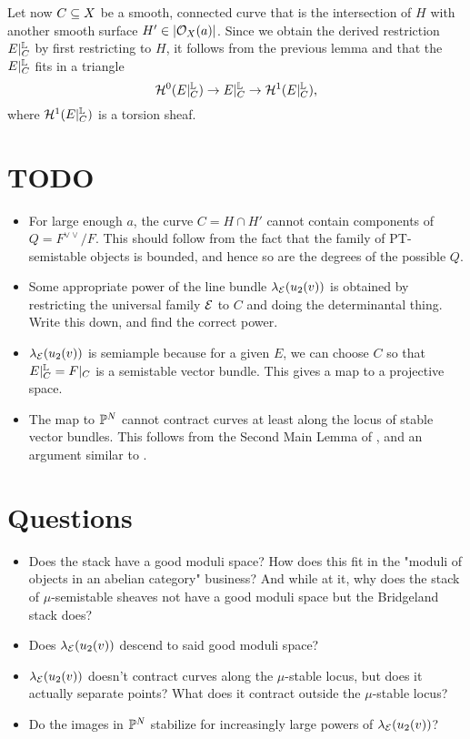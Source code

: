 \documentclass[letterpaper,12pt]{amsart}
\theoremstyle{remark}
\begin{document}
Let now $C \subseteq X$ be a smooth, connected curve that is the intersection of $H$ with another smooth surface $H' \in |\mathcal{O}_X(a)|$. Since we obtain the derived restriction $E|^{\mathbb{L}}_C$ by first restricting to $H$, it follows from the previous lemma and \cite[Lemma 6.3]{t} that the $E|^{\mathbb{L}}_C$ fits in a triangle
\[ \mathcal{H}^0(E|^{\mathbb{L}}_C) \to E|^{\mathbb{L}}_C \to \mathcal{H}^1(E|^{\mathbb{L}}_C), \]
where $\mathcal{H}^1(E|^{\mathbb{L}}_C)$ is a torsion sheaf.

\section{TODO}
\begin{itemize}
    \item For large enough $a$, the curve $C = H \cap H'$ cannot contain components of $Q = F^{\vee\vee}/F$. This should follow from the fact that the family of PT-semistable objects is bounded, and hence so are the degrees of the possible $Q$.
    \item Some appropriate power of the line bundle $\lambda_{\mathcal{E}}(u_2(v))$ is obtained by restricting the universal family $\mathcal{E}$ to $C$ and doing the determinantal thing. Write this down, and find the correct power.
    \item $\lambda_{\mathcal{E}}(u_2(v))$ is semiample because for a given $E$, we can choose $C$ so that $E|^{\mathbb{L}}_C = F|_C$ is a semistable vector bundle. This gives a map to a projective space.
    \item The map to $\mathbb{P}^N$ cannot contract curves at least along the locus of stable vector bundles. This follows from the Second Main Lemma of \cite{seshadri}, and an argument similar to \cite[Lemma 8.2.12]{HL}.
\end{itemize}

\section{Questions}
\begin{itemize}
    \item Does the stack have a good moduli space? How does this fit in the "moduli of objects in an abelian category" business? And while at it, why does the stack of $\mu$-semistable sheaves not have a good moduli space but the Bridgeland stack does?
    \item Does $\lambda_{\mathcal{E}}(u_2(v))$ descend to said good moduli space?
    \item $\lambda_{\mathcal{E}}(u_2(v))$ doesn't contract curves along the $\mu$-stable locus, but does it actually separate points? What does it contract outside the $\mu$-stable locus?
    \item Do the images in $\mathbb{P}^N$ stabilize for increasingly large powers of $\lambda_{\mathcal{E}}(u_2(v))$?
\end{itemize}



\end{document}
